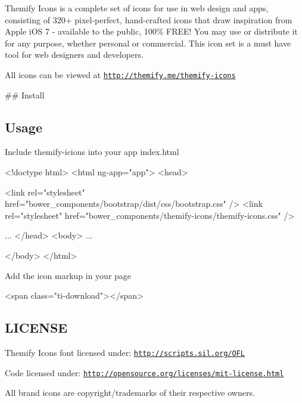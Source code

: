 \href{https://gratipay.com/lykmapipo/}{\tt }

\href{https://gratipay.com/lykmapipo/}{\tt }

Themify Icons is a complete set of icons for use in web design and apps, consisting of 320+ pixel-\/perfect, hand-\/crafted icons that draw inspiration from Apple i\+OS 7 -\/ available to the public, 100\% F\+R\+E\+E! You may use or distribute it for any purpose, whether personal or commercial. This icon set is a must have tool for web designers and developers.

All icons can be viewed at \href{http://themify.me/themify-icons}{\tt http\+://themify.\+me/themify-\/icons}

\#\# Install 


\subsection*{Usage}


\begin{DoxyItemize}
\item Include {\ttfamily themify-\/icions} into your app {\ttfamily index.\+html} 
\begin{DoxyCode}
<!doctype html>
<html ng-app="app">
<head>
    
    
    <link rel="stylesheet" href="bower\_components/bootstrap/dist/css/bootstrap.css" />
    <link rel="stylesheet" href="bower\_components/themify-icons/themify-icons.css" />
    
    
    ...
</head>
<body>
    ...

</body>
</html>
\end{DoxyCode}

\item Add the icon markup in your page 
\begin{DoxyCode}
<span class="ti-download"></span>
\end{DoxyCode}

\end{DoxyItemize}

\subsection*{L\+I\+C\+E\+N\+SE}


\begin{DoxyItemize}
\item Themify Icons font licensed under\+: \href{http://scripts.sil.org/OFL}{\tt http\+://scripts.\+sil.\+org/\+O\+FL}
\item Code licensed under\+: \href{http://opensource.org/licenses/mit-license.html}{\tt http\+://opensource.\+org/licenses/mit-\/license.\+html}
\item All brand icons are copyright/trademarks of their respective owners.
\end{DoxyItemize}

